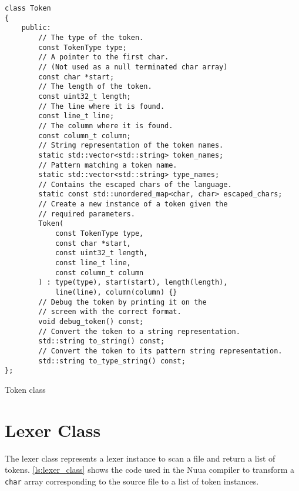 \begin{listing}[H]
\begin{verbatim}
class Token
{
    public:
        // The type of the token.
        const TokenType type;
        // A pointer to the first char.
        // (Not used as a null terminated char array)
        const char *start;
        // The length of the token.
        const uint32_t length;
        // The line where it is found.
        const line_t line;
        // The column where it is found.
        const column_t column;
        // String representation of the token names.
        static std::vector<std::string> token_names;
        // Pattern matching a token name.
        static std::vector<std::string> type_names;
        // Contains the escaped chars of the language.
        static const std::unordered_map<char, char> escaped_chars;
        // Create a new instance of a token given the
        // required parameters.
        Token(
            const TokenType type,
            const char *start,
            const uint32_t length,
            const line_t line,
            const column_t column
        ) : type(type), start(start), length(length),
            line(line), column(column) {}
        // Debug the token by printing it on the
        // screen with the correct format.
        void debug_token() const;
        // Convert the token to a string representation.
        std::string to_string() const;
        // Convert the token to its pattern string representation.
        std::string to_type_string() const;
};
\end{verbatim}
\caption{Token class}
\label{ls:token_class}
\end{listing}

\section{Lexer Class}

The lexer class represents a lexer instance to scan a file and return a list of tokens.
\autoref{ls:lexer_class} shows the code used in the Nuua compiler to transform a \texttt{char} array
corresponding to the source file to a list of token instances.


